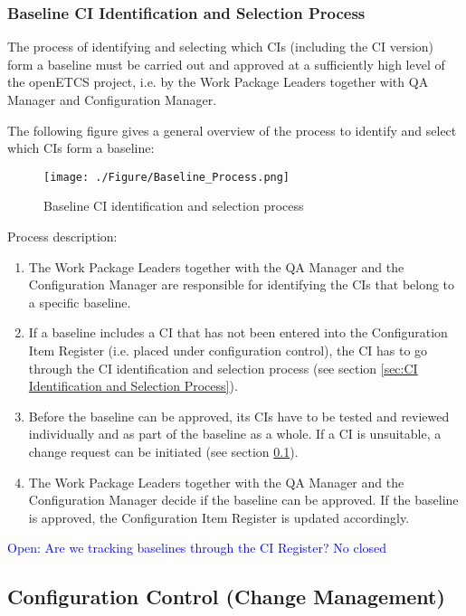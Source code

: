 \documentclass{template/openetcs_report}
\begin{document}
\subsubsection{Baseline CI Identification and Selection Process} %
\label{sec:Baseline CI Identification and Selection Process}

The process of identifying and selecting which CIs (including the CI version) form a baseline must be carried out and approved at a sufficiently high level of the openETCS project, i.e. by the Work Package Leaders together with QA Manager and Configuration Manager.

The following figure gives a general overview of the process to identify and select which CIs form a baseline:

\begin{figure}[H]
\centering
\caption{Baseline CI identification and selection process}
\texttt{[image: ./Figure/Baseline\_Process.png]}
\end{figure}

Process description:

\vspace{-10pt}
\begin{enumerate}
\item The Work Package Leaders together with the QA Manager and the Configuration Manager are responsible for identifying the CIs that belong to a specific baseline.
\item If a baseline includes a CI that has not been entered into the Configuration Item Register (i.e. placed under configuration control), the CI has to go through the CI identification and selection process (see section \ref{sec:CI Identification and Selection Process}).
\item Before the baseline can be approved, its CIs have to be tested and reviewed individually and as part of the baseline as a whole. If a CI is unsuitable, a change request can be initiated (see section \ref{sec:Configuration Control (Change Management)}).
\item The Work Package Leaders together with the QA Manager and the Configuration Manager decide if the baseline can be approved. If the baseline is approved, the Configuration Item Register is updated accordingly.
\end{enumerate}

\textcolor{blue}{Open: Are we tracking baselines through the CI Register? No closed}


\subsection{Configuration Control (Change Management)} %
\label{sec:Configuration Control (Change Management)}
\end{document}
